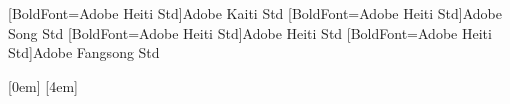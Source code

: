 
\usepackage[a4paper,top=1in,bottom=1in,left=1in,right=1in]{geometry} %
\usepackage{xeCJK} %
\usepackage[super, square, sort&compress]{natbib} %
\usepackage{titlesec, titletoc} %
\usepackage{xCJKnumb} %
\usepackage{amssymb,amsmath,amsthm} %
\usepackage{diagbox}
\usepackage{multirow} %
\usepackage{booktabs} %
\usepackage{rotating} %
\usepackage{tabularx}
\usepackage{graphicx} %
\usepackage{footnote} %
\usepackage{threeparttable} %
\usepackage{hyperref}

[BoldFont=Adobe Heiti Std]{Adobe Kaiti Std}
[BoldFont=Adobe Heiti Std]{Adobe Song Std}
[BoldFont=Adobe Heiti Std]{Adobe Heiti Std}
[BoldFont=Adobe Heiti Std]{Adobe Fangsong Std}
\newcommand{\kai}[1]{{\CJKfamily{kai}#1}}
\newcommand{\hei}[1]{{\CJKfamily{hei}#1}}
\newcommand{\fsong}[1]{{\CJKfamily{fsong}#1}}
\setsansfont[Scale=MatchLowercase,Mapping=tex-text]{TeXGyrePagella}
\setmonofont[Scale=MatchLowercase]{Courier New}
\newcommand{\erhao}{\fontsize{22pt}{\baselineskip}\selectfont}
\newcommand{\xiaoerhao}{\fontsize{18pt}{\baselineskip}\selectfont}
\newcommand{\sanhao}{\fontsize{16pt}{\baselineskip}\selectfont}
\newcommand{\xiaosanhao}{\fontsize{15pt}{\baselineskip}\selectfont}
\newcommand{\sihao}{\fontsize{14pt}{\baselineskip}\selectfont}
\newcommand{\xiaosihao}{\fontsize{12pt}{\baselineskip}\selectfont}
\newcommand{\wuhao}{\fontsize{10.5pt}{\baselineskip}\selectfont}
\newcommand{\xiaowuhao}{\fontsize{9pt}{\baselineskip}\selectfont}
\newcommand{\liuhao}{\fontsize{7.5pt}{\baselineskip}\selectfont}

[0em]
{}
{\large{}}
{}{\hfill\contentspage}
%
[4em]
{}
{\thecontentslabel\quad}
{}{ \contentspage}

